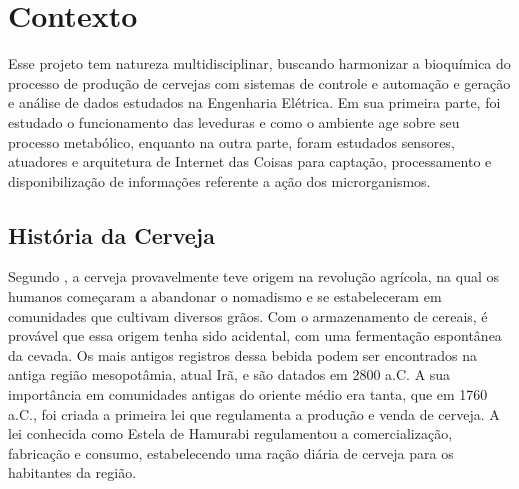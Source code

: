\chapter{Contexto}

Esse projeto tem natureza multidisciplinar, buscando harmonizar a bioquímica do
processo de produção de cervejas com sistemas de controle e automação e
geração e análise de dados estudados na Engenharia Elétrica. Em sua primeira
parte, foi estudado o funcionamento das leveduras e como o ambiente age sobre
seu processo metabólico, enquanto na outra parte, foram estudados sensores,
atuadores e arquitetura de Internet das Coisas para captação, processamento e
disponibilização de informações referente a ação dos microrganismos.

\section{História da Cerveja}




Segundo , a cerveja provavelmente teve origem na revolução agrícola, na qual os humanos começaram a abandonar o nomadismo e se estabeleceram em comunidades que cultivam diversos grãos. Com o armazenamento de cereais, é provável que essa origem tenha sido acidental, com uma fermentação espontânea da cevada. Os mais antigos registros dessa bebida podem ser encontrados na antiga região mesopotâmia, atual Irã, e são datados em 2800 a.C. A sua importância em comunidades antigas do oriente médio era tanta, que em 1760 a.C., foi criada a primeira lei que regulamenta a produção e venda de cerveja. A lei conhecida como Estela de Hamurabi regulamentou a comercialização, fabricação e consumo, estabelecendo uma ração diária de cerveja para os habitantes da região. 


